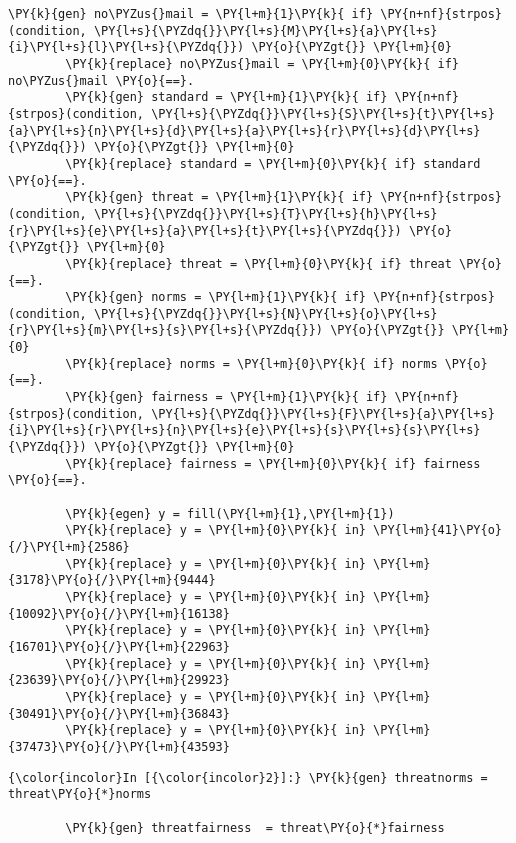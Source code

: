 \documentclass[11pt,notitlepage]{article}\usepackage[]{graphicx}\usepackage[]{color}
\makeatletter
\newenvironment{kframe}{%
 \def\at@end@of@kframe{}%
 \ifinner\ifhmode%
  \def\at@end@of@kframe{\end{minipage}}%
  \begin{minipage}{\columnwidth}%
 \fi\fi%
 \def\FrameCommand##1{\hskip\@totalleftmargin \hskip-\fboxsep
 \colorbox{shadecolor}{##1}\hskip-\fboxsep
     \hskip-\linewidth \hskip-\@totalleftmargin \hskip\columnwidth}%
 \MakeFramed {\advance\hsize-\width
   \@totalleftmargin\z@ \linewidth\hsize
   \@setminipage}}%
 {\par\unskip\endMakeFramed%
 \at@end@of@kframe}
\newenvironment{knitrout}{}{} %
\makeatother
\begin{document}
\begin{enumerate}[a)]
\begin{knitrout}
\begin{kframe}
\begin{Verbatim}[commandchars=\\\{\}]
        \PY{k}{gen} no\PYZus{}mail = \PY{l+m}{1}\PY{k}{ if} \PY{n+nf}{strpos}(condition, \PY{l+s}{\PYZdq{}}\PY{l+s}{M}\PY{l+s}{a}\PY{l+s}{i}\PY{l+s}{l}\PY{l+s}{\PYZdq{}}) \PY{o}{\PYZgt{}} \PY{l+m}{0}
        \PY{k}{replace} no\PYZus{}mail = \PY{l+m}{0}\PY{k}{ if} no\PYZus{}mail \PY{o}{==}.
        \PY{k}{gen} standard = \PY{l+m}{1}\PY{k}{ if} \PY{n+nf}{strpos}(condition, \PY{l+s}{\PYZdq{}}\PY{l+s}{S}\PY{l+s}{t}\PY{l+s}{a}\PY{l+s}{n}\PY{l+s}{d}\PY{l+s}{a}\PY{l+s}{r}\PY{l+s}{d}\PY{l+s}{\PYZdq{}}) \PY{o}{\PYZgt{}} \PY{l+m}{0}
        \PY{k}{replace} standard = \PY{l+m}{0}\PY{k}{ if} standard \PY{o}{==}.
        \PY{k}{gen} threat = \PY{l+m}{1}\PY{k}{ if} \PY{n+nf}{strpos}(condition, \PY{l+s}{\PYZdq{}}\PY{l+s}{T}\PY{l+s}{h}\PY{l+s}{r}\PY{l+s}{e}\PY{l+s}{a}\PY{l+s}{t}\PY{l+s}{\PYZdq{}}) \PY{o}{\PYZgt{}} \PY{l+m}{0}
        \PY{k}{replace} threat = \PY{l+m}{0}\PY{k}{ if} threat \PY{o}{==}.
        \PY{k}{gen} norms = \PY{l+m}{1}\PY{k}{ if} \PY{n+nf}{strpos}(condition, \PY{l+s}{\PYZdq{}}\PY{l+s}{N}\PY{l+s}{o}\PY{l+s}{r}\PY{l+s}{m}\PY{l+s}{s}\PY{l+s}{\PYZdq{}}) \PY{o}{\PYZgt{}} \PY{l+m}{0}
        \PY{k}{replace} norms = \PY{l+m}{0}\PY{k}{ if} norms \PY{o}{==}.
        \PY{k}{gen} fairness = \PY{l+m}{1}\PY{k}{ if} \PY{n+nf}{strpos}(condition, \PY{l+s}{\PYZdq{}}\PY{l+s}{F}\PY{l+s}{a}\PY{l+s}{i}\PY{l+s}{r}\PY{l+s}{n}\PY{l+s}{e}\PY{l+s}{s}\PY{l+s}{s}\PY{l+s}{\PYZdq{}}) \PY{o}{\PYZgt{}} \PY{l+m}{0}
        \PY{k}{replace} fairness = \PY{l+m}{0}\PY{k}{ if} fairness \PY{o}{==}.
        
        \PY{k}{egen} y = fill(\PY{l+m}{1},\PY{l+m}{1})
        \PY{k}{replace} y = \PY{l+m}{0}\PY{k}{ in} \PY{l+m}{41}\PY{o}{/}\PY{l+m}{2586}
        \PY{k}{replace} y = \PY{l+m}{0}\PY{k}{ in} \PY{l+m}{3178}\PY{o}{/}\PY{l+m}{9444}
        \PY{k}{replace} y = \PY{l+m}{0}\PY{k}{ in} \PY{l+m}{10092}\PY{o}{/}\PY{l+m}{16138}
        \PY{k}{replace} y = \PY{l+m}{0}\PY{k}{ in} \PY{l+m}{16701}\PY{o}{/}\PY{l+m}{22963}
        \PY{k}{replace} y = \PY{l+m}{0}\PY{k}{ in} \PY{l+m}{23639}\PY{o}{/}\PY{l+m}{29923}
        \PY{k}{replace} y = \PY{l+m}{0}\PY{k}{ in} \PY{l+m}{30491}\PY{o}{/}\PY{l+m}{36843}
        \PY{k}{replace} y = \PY{l+m}{0}\PY{k}{ in} \PY{l+m}{37473}\PY{o}{/}\PY{l+m}{43593}
\end{Verbatim}

    \begin{Verbatim}[commandchars=\\\{\}]
{\color{incolor}In [{\color{incolor}2}]:} \PY{k}{gen} threatnorms = threat\PY{o}{*}norms
        
        \PY{k}{gen} threatfairness  = threat\PY{o}{*}fairness	
        

\end{Verbatim}
\end{kframe}
\end{knitrout}
\end{enumerate}
\end{document}

